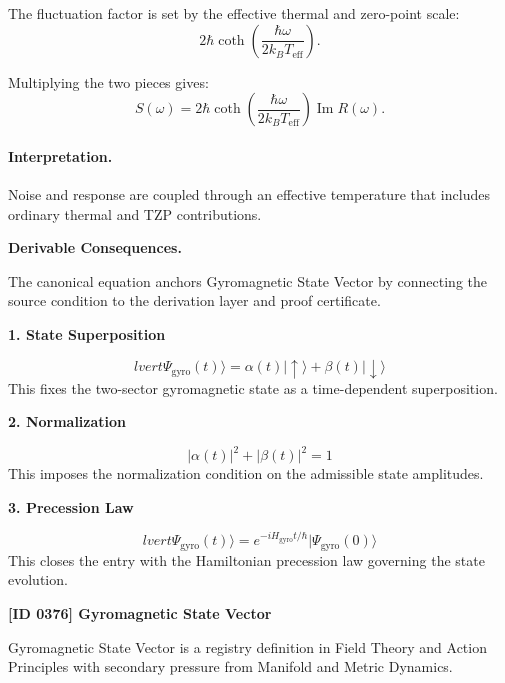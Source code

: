 The fluctuation factor is set by the effective thermal and zero-point scale:
\begin{equation}
2\hbar
\coth\left(
\frac{\hbar\omega}{2k_B T_{\mathrm{eff}}}
\right).
\end{equation}

Multiplying the two pieces gives:
\begin{equation}
\boxed{
S(\omega)
=
2\hbar
\coth\left(
\frac{\hbar\omega}{2k_B T_{\mathrm{eff}}}
\right)
\operatorname{Im}R(\omega).
}
\end{equation}

\paragraph{Interpretation.}
Noise and response are coupled through an effective temperature that includes ordinary thermal and TZP contributions.

\par\vspace{0.35em}
\noindent\textbf{Derivable Consequences.}\quad
\begingroup
\footnotesize
\raggedright
The canonical equation anchors Gyromagnetic State Vector by connecting the source condition to the derivation layer and proof certificate.
\par\endgroup

\noindent\textbf{1. State Superposition}\par
\[
lvert\Psi_{\mathrm{gyro}}(t)\rangle=\alpha(t)\lvert\uparrow\rangle+\beta(t)\lvert\downarrow\rangle
\]
\noindent This fixes the two-sector gyromagnetic state as a time-dependent superposition.\par
\noindent\textbf{2. Normalization}\par
\[
|\alpha(t)|^2+|\beta(t)|^2=1
\]
\noindent This imposes the normalization condition on the admissible state amplitudes.\par
\noindent\textbf{3. Precession Law}\par
\[
lvert\Psi_{\mathrm{gyro}}(t)\rangle=e^{-iH_{\mathrm{gyro}}t/\hbar}\lvert\Psi_{\mathrm{gyro}}(0)\rangle
\]
\noindent This closes the entry with the Hamiltonian precession law governing the state evolution.\par

\clearpage
\noindent\textbf{[ID 0376] Gyromagnetic State Vector}\par
\vspace{0.35em}
\begingroup\small
{}
Gyromagnetic State Vector is a registry definition in Field Theory and Action Principles with secondary pressure from Manifold and Metric Dynamics.

